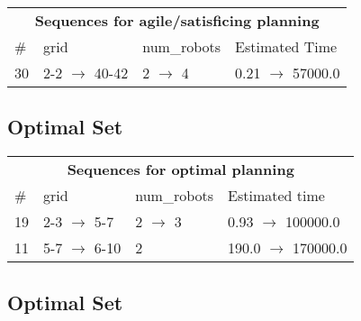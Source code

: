 \documentclass{article}
\begin{document}
                        \begin{center}
                        \begin{tabular}{l|l|l|l}
                        \multicolumn{4}{c}{\bf \large Sequences for agile/satisficing planning}\\
                        \# & grid & num\_robots & Estimated Time\\\midrule
                        30&2-2 $\rightarrow$ 40-42&2 $\rightarrow$ 4&0.21 $\rightarrow$ 57000.0
                        \end{tabular}
                        \end{center}
                    
                            \subsection*{Optimal Set}

                            \begin{center}
                            \begin{tabular}{l|l|l|l}
                            \multicolumn{4}{c}{\bf \large Sequences for optimal planning}\\
                            \# & grid & num\_robots & Estimated time\\\midrule
                            19&2-3 $\rightarrow$ 5-7&2 $\rightarrow$ 3&0.93 $\rightarrow$ 100000.0\\
11&5-7 $\rightarrow$ 6-10&2&190.0 $\rightarrow$ 170000.0
                            \end{tabular}
                            \end{center}
                    
                                \subsection*{Optimal Set}
                                
\end{document}
